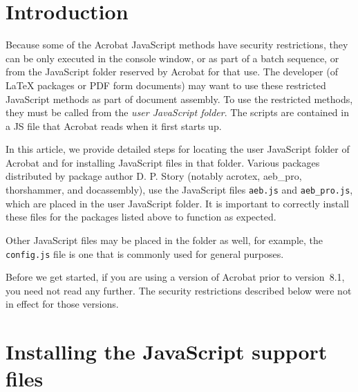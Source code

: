 \documentclass{article}
\title{\jsSupInstr}
\author{D. P. Story}
\def\app#1{\textsf{#1}}
\def\SC#1{{\small#1}}
\def\PDF{\SC{PDF}}
\let\pkg\textsf
\begin{document}
\maketitle

\section{Introduction}

Because some of the \app{Acrobat} JavaScript methods have security
restrictions, they can be only executed in the console window, or as part
of a batch sequence, or from the JavaScript folder reserved by
\app{Acrobat} for that use. The developer (of {\LaTeX} packages or {\PDF}
form documents) may want to use these restricted JavaScript methods as
part of document assembly. To use the restricted methods, they must be
called from the \emph{user JavaScript folder}. The scripts are contained in a
\SC{JS} file that \app{Acrobat} reads when it first starts up.

In this article, we provide detailed steps for locating the user JavaScript
folder of \app{Acrobat} and for installing JavaScript files in that folder.
Various packages distributed by package author D. P. Story (notably
\pkg{acrotex}, \pkg{aeb\_pro}, \pkg{thorshammer}, and \pkg{docassembly}), use
the JavaScript files \texttt{aeb.js} and \texttt{aeb\_pro.js}, which are
placed in the user JavaScript folder. It is important to correctly install
these files for the packages listed above to function as expected.

Other JavaScript files may be placed in the folder as well, for example, the
\texttt{config.js} file is one that is commonly used for general purposes.

Before we get started, if you are using a version of \app{Acrobat} prior
to version~8.1, you need not read any further. The security restrictions
described below were not in effect for those versions.

\section{Installing the JavaScript support files}
\end{document}
